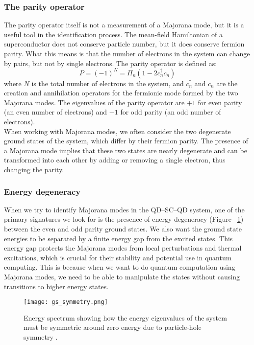 \documentclass[11pt, letterpaper, titlepage]{article}
\begin{document}
\subsubsection{The parity operator}
The parity operator itself is not a measurement of a Majorana mode, but it is a useful tool in the identification process. The mean-field Hamiltonian of a superconductor does not conserve particle number, but it does conserve fermion parity. What this means is that the number of electrons in the system can change by pairs, but not by single electrons. The parity operator is defined as:
$$
P = (-1)^{N} = Π_n(1 - 2c_n ^{†} c_n)
$$
where $N$ is the total number of electrons in the system, and $c_n^{†}$ and $c_n$ are the creation and annihilation operators for the fermionic mode formed by the two Majorana modes. The eigenvalues of the parity operator are $+1$ for even parity (an even number of electrons) and $-1$ for odd parity (an odd number of electrons).\\
When working with Majorana modes, we often consider the two degenerate ground states of the system, which differ by their fermion parity. The presence of a Majorana mode implies that these two states are nearly degenerate and can be transformed into each other by adding or removing a single electron, thus changing the parity.\\

\subsubsection{Energy degeneracy}
When we try to identify Majorana modes in the QD–SC–QD system, one of the primary signatures we look for is the presence of energy degeneracy (Figure ~\ref{fig:gs_symmetry}) between the even and odd parity ground states. We also want the ground state energies to be separated by a finite energy gap from the excited states. This energy gap protects the Majorana modes from local perturbations and thermal excitations, which is crucial for their stability and potential use in quantum computing. This is because when we want to do quantum computation using Majorana modes, we need to be able to manipulate the states without causing transitions to higher energy states.\\
\begin{figure}
  \centering
  \texttt{[image: gs\_symmetry.png]}%
  \caption{Energy spectrum showing how the energy eigenvalues of the system must be symmetric around zero energy due to particle-hole symmetry \cite{Topocondmat}.}
  \label{fig:gs_symmetry}
\end{figure}
\newpage
\end{document}
